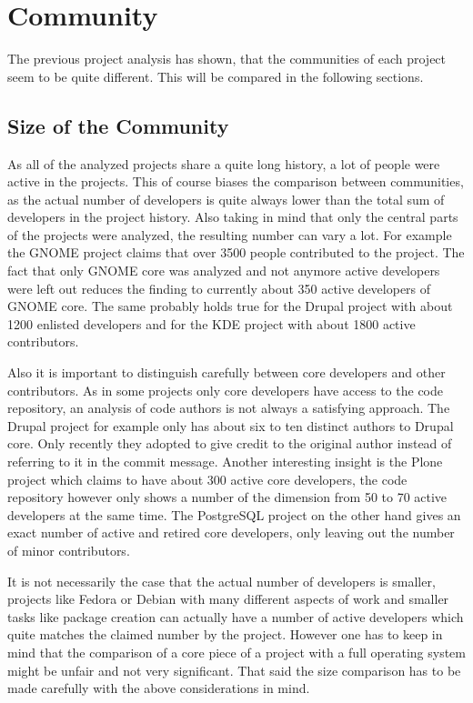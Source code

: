 
\section{Community} %
\label{sec:Community}

The previous project analysis has shown, that the communities of each project
seem to be quite different. This will be compared in the following sections.

\subsection{Size of the Community} %
\label{sub:Size of the Community}

As all of the analyzed projects share a quite long history, a lot of people
were active in the projects. This of course biases the comparison between
communities, as the actual number of developers is quite always lower than the
total sum of developers in the project history. Also taking in mind that only
the central parts of the projects were analyzed, the resulting number can vary
a lot. For example the GNOME project claims that over 3500 people contributed
to the project. The fact that only GNOME core was analyzed and not anymore
active developers were left out reduces the finding to currently about 350
active developers of GNOME core. The same probably holds true for the Drupal
project with about 1200 enlisted developers and for the KDE project with about
1800 active contributors.

Also it is important to distinguish carefully between core developers and other
contributors. As in some projects only core developers have access to the code
repository, an analysis of code authors is not always a satisfying approach.
The Drupal project for example only has about six to ten distinct authors to
Drupal core. Only recently they adopted to give credit to the original author
instead of referring to it in the commit message. Another interesting insight
is the Plone project which claims to have about 300 active core developers, the
code repository however only shows a number of the dimension from 50 to 70
active developers at the same time. The PostgreSQL project on the other hand
gives an exact number of active and retired core developers, only leaving out
the number of minor contributors.

It is not necessarily the case that the actual number of developers is smaller,
projects like Fedora or Debian with many different aspects of work and smaller
tasks like package creation can actually have a number of active developers
which quite matches the claimed number by the project. However one has to keep
in mind that the comparison of a core piece of a project with a full operating
system might be unfair and not very significant. That said the size comparison
has to be made carefully with the above considerations in mind.

